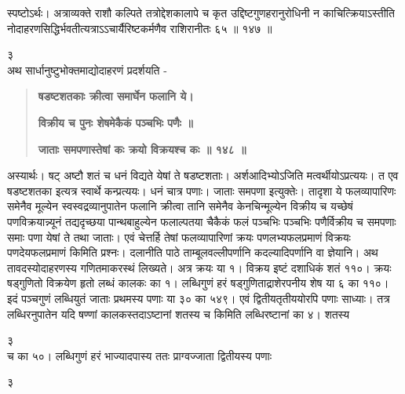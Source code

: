 \documentclass[11pt, openany]{book}
\begin{document}
\begin{sloppypar}
\hangindent=0.2in \hspace{0.2in}स्पष्टोऽर्थः। अत्राव्यक्ते राशौ कल्पिते तत्रोद्देशकालापे च कृत उद्दिष्टगुणहरानुरोधिनी न काचित्क्रियाऽस्तीति नोदाहरणसिद्धिर्भवतीत्यत्राऽऽचार्यैरिष्टकर्मणैव राशिरानीतः ६५ ॥ १४७ ॥

\hspace{4.5in}३\\

\hangindent=0.2in \hspace{0.2in}अथ सार्धानुष्टुभोक्तमाद्योदाहरणं प्रदर्शयति -

\begin{quote}
\hspace{1in}\textbf{षडष्टशतकाः क्रीत्वा समार्घेन फलानि ये।}

\hspace{1in}\textbf{विक्रीय च पुनः शेषमेकैकं पञ्चभिः पणैः ॥}

\hspace{1in}\textbf{जाताः समपणास्तेषां कः क्रयो विक्रयश्च कः ॥ १४८ ॥}
\end{quote}

\hangindent=0.2in \hspace{0.2in}अस्यार्थः। षट् अष्टौ शतं च धनं विद्यते येषां ते षडष्टशताः। अर्शआदिभ्योऽजिति मत्वर्थीयोऽप्रत्ययः। त एव षडष्टशतका इत्यत्र स्वार्थे कन्प्रत्ययः। धनं चात्र पणाः। जाताः समपणा इत्युक्तेः। तादृशा ये फलव्यापारिणः समेनैव मूल्येन स्वस्वद्रव्यानुपातेन फलानि क्रीत्वा तानि समेनैव केनचिन्मूल्येन विक्रीय च यच्छेषं पणविक्रयान्न्यूनं तद्यदृच्छया पान्थबाहुल्येन फलाल्पतया चैकैकं फलं पञ्चभिः पञ्चभिः पणैर्विक्रीय च समपणाः समाः पणा येषां ते तथा जाताः। एवं चेत्तर्हि तेषां फलव्यापारिणां क्रयः पणलभ्यफलप्रमाणं विक्रयः पणदेयफलप्रमाणं किमिति प्रश्नः। दलानीति पाठे ताम्बूलवल्लीपर्णानि कदल्यादिपर्णानि वा ज्ञेयानि। अथ तावदस्योदाहरणस्य गणितमाकरस्थं लिख्यते। अत्र क्रयः या १। विक्रय इष्टं दशाधिकं शतं ११०। क्रयः षड्गुणितो विक्रयेण हृतो लब्धं कालकः का १। लब्धिगुणं हरं षड्गुणिताद्राशेरपनीय शेष या ६ का ११०। इदं पञ्चगुणं लब्धियुतं जाताः प्रथमस्य पणाः या ३० का ५४९। एवं द्वितीयतृतीययोरपि पणाः साध्याः। तत्र लब्धिरनुपातेन यदि षण्णां कालकस्तदाऽष्टानां शतस्य च किमिति लब्धिरष्टानां का ४। शतस्य

\hspace{4.1in}३\\

\hangindent=0.2in च का ५०। लब्धिगुणं हरं भाज्यादपास्य ततः प्राग्वज्जाता द्वितीयस्य पणाः

\hspace{0.5in}३\\


\end{sloppypar}
\end{document}
